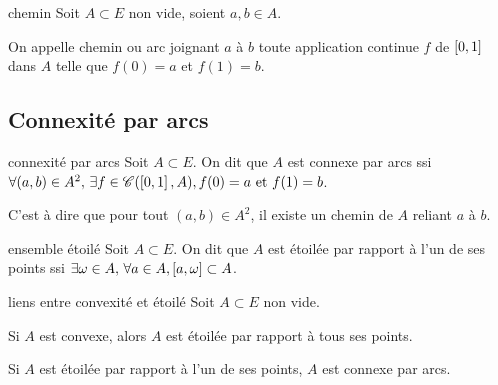 \begin{definition}{chemin }{}
    Soit $A \subset E$ non vide, soient $a, b \in A$. 

    On appelle chemin ou arc joignant $a$ à $b$ toute application continue $f$ de 
    $\left[0, 1\right]$ dans $A$ telle que $f(0) = a$ et $f(1) = b$.
\end{definition}


\subsection{Connexité par arcs }


\begin{definition}{connexité par arcs }{}
    Soit $A \subset E$. 
    On dit que $A$ est connexe par arcs ssi $\forall (a, b) \in A^2, \, \exists f \in \mathscr C(\left[0, 1\right], A), f(0) = a \text{ et } f(1) = b$. 

    C'est à dire que pour tout $(a, b) \in A^2$, il existe un chemin de $A$ reliant $a$ à $b$.
\end{definition}


\begin{definition}{ensemble étoilé }{}
    Soit $A \subset E$.
    On dit que $A$ est étoilée par rapport à l'un de ses points ssi $\exists \omega \in A, 
    \, \forall a \in A, \left[a, \omega\right] \subset A$.
\end{definition}

\begin{proposition}{liens entre convexité et étoilé }{}
    Soit $A \subset E$ non vide. 

    Si $A$ est convexe, alors $A$ est étoilée par rapport à tous ses points. 

    Si $A$ est étoilée par rapport à l'un de ses points, $A$ est connexe par arcs. 
\end{proposition}


